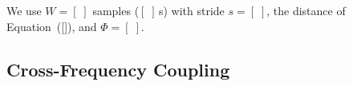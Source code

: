 \noindent
We use $W = [\;]$ samples ($[\;]$\,s) with stride $s = [\;]$, the distance
of Equation~([\;]), and $\Phi = [\;]$.


\subsection{Cross-Frequency Coupling}
\label{subsec:cfc}

